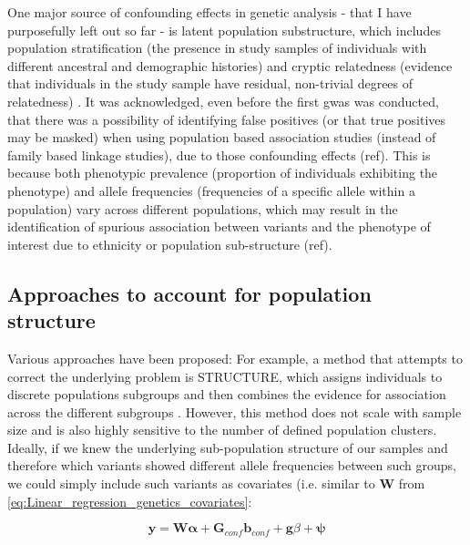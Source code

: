 One major source of confounding effects in genetic analysis - that I have purposefully left out so far -  is latent population substructure, which includes population stratification (the presence in study samples of individuals with different ancestral and demographic histories) and cryptic relatedness (evidence that individuals in the study sample have residual, non-trivial degrees of relatedness) \cite{mccarthy2008genome}.
It was acknowledged, even before the first \gls{gwas} was conducted, that there was a possibility of identifying false positives (or that true positives may be masked) when using population based association studies (instead of family based linkage studies), due to those confounding effects (ref). 
This is because both phenotypic prevalence (proportion of individuals exhibiting the phenotype) and allele frequencies (frequencies of a specific allele within a population) vary across different populations, which may result in the identification of spurious association between variants and the phenotype of interest due to ethnicity or population sub-structure (ref).


\subsection{Approaches to account for population structure}

Various approaches have been proposed:
For example, a method that attempts to correct the underlying problem is STRUCTURE, which assigns individuals to discrete populations subgroups and then combines the evidence for association across the different subgroups \cite{pritchard2000inference}. 
However, this method does not scale with sample size and is also highly sensitive to the number of defined population clusters.\\

Ideally, if we knew the underlying sub-population structure of our samples and therefore which variants showed different allele frequencies between such groups, we could simply include such variants as covariates (i.e. similar to $\mathbf{W}$ from \eqref{eq:Linear_regression_genetics_covariates}:

\begin{equation}\label{eq:LM_G_confounding}
    \mathbf{y} =  \mathbf{W}\boldsymbol{\alpha} +  \mathbf{G}_{conf}\mathbf{b}_{conf} + \mathbf{g}\beta + \boldsymbol{\psi} 
\end{equation}

